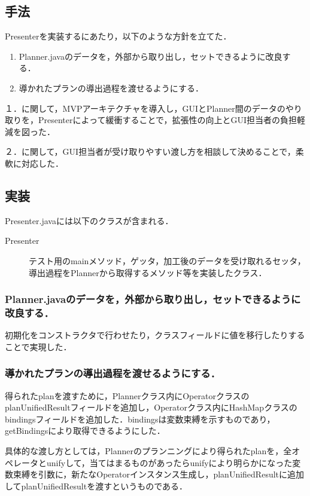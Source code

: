\documentclass[12pt]{jarticle}
\begin{document}
\subsection{手法}
Presenterを実装するにあたり，以下のような方針を立てた．
\begin{enumerate}
\item Planner.javaのデータを，外部から取り出し，セットできるように改良する．
\item 導かれたプランの導出過程を渡せるようにする．
\end{enumerate}

１．に関して，MVPアーキテクチャを導入し，GUIとPlanner間のデータのやり取りを，Presenterによって緩衝することで，拡張性の向上とGUI担当者の負担軽減を図った．

２．に関して，GUI担当者が受け取りやすい渡し方を相談して決めることで，柔軟に対応した．

\subsection{実装}
Presenter.javaには以下のクラスが含まれる．
\begin{description}
\item[Presenter] テスト用のmainメソッド，ゲッタ，加工後のデータを受け取れるセッタ，導出過程をPlannerから取得するメソッド等を実装したクラス．
\end{description}

\subsubsection{Planner.javaのデータを，外部から取り出し，セットできるように改良する．}
初期化をコンストラクタで行わせたり，クラスフィールドに値を移行したりすることで実現した．

\subsubsection{導かれたプランの導出過程を渡せるようにする．}
得られたplanを渡すために，Plannerクラス内にOperatorクラスのplanUnifiedResultフィールドを追加し，Operatorクラス内にHashMapクラスのbindingsフィールドを追加した．bindingsは変数束縛を示すものであり，getBindingsにより取得できるようにした．

具体的な渡し方としては，Plannerのプランニングにより得られたplanを，全オペレータとunifyして，当てはまるものがあったらunifyにより明らかになった変数束縛を引数に，新たなOperatorインスタンス生成し，planUnifiedResultに追加してplanUnifiedResultを渡すというものである．
\end{document}
